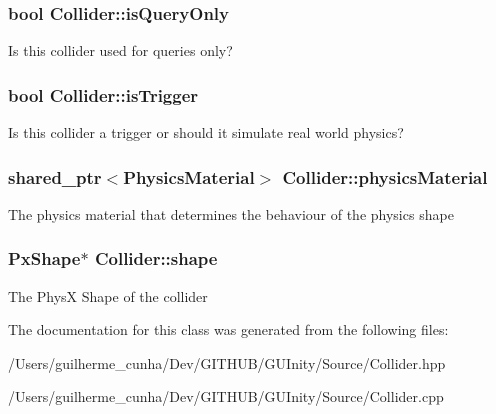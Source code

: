 \subsubsection[{is\+Query\+Only}]{\setlength{\rightskip}{0pt plus 5cm}bool Collider\+::is\+Query\+Only\hspace{0.3cm}{\ttfamily [protected]}}\label{class_collider_a7a04883dc178bfc1b0bbf7750eb9f4d1}
Is this collider used for queries only? \hypertarget{class_collider_a3068bd0bbdb66fc93a3ef3063ac556fa}{}
\subsubsection[{is\+Trigger}]{\setlength{\rightskip}{0pt plus 5cm}bool Collider\+::is\+Trigger\hspace{0.3cm}{\ttfamily [protected]}}\label{class_collider_a3068bd0bbdb66fc93a3ef3063ac556fa}
Is this collider a trigger or should it simulate real world physics? \hypertarget{class_collider_a7cf889cd7bc213bcac3e0c6f5f42f150}{}
\subsubsection[{physics\+Material}]{\setlength{\rightskip}{0pt plus 5cm}shared\+\_\+ptr$<${\bf Physics\+Material}$>$ Collider\+::physics\+Material\hspace{0.3cm}{\ttfamily [protected]}}\label{class_collider_a7cf889cd7bc213bcac3e0c6f5f42f150}
The physics material that determines the behaviour of the physics shape \hypertarget{class_collider_a0eabd23889c23a5cb622547b1fc484d8}{}
\subsubsection[{shape}]{\setlength{\rightskip}{0pt plus 5cm}Px\+Shape$\ast$ Collider\+::shape\hspace{0.3cm}{\ttfamily [protected]}}\label{class_collider_a0eabd23889c23a5cb622547b1fc484d8}
The Phys\+X Shape of the collider 

The documentation for this class was generated from the following files\+:\begin{DoxyCompactItemize}
\item 
/\+Users/guilherme\+\_\+cunha/\+Dev/\+G\+I\+T\+H\+U\+B/\+G\+U\+Inity/\+Source/Collider.\+hpp\item 
/\+Users/guilherme\+\_\+cunha/\+Dev/\+G\+I\+T\+H\+U\+B/\+G\+U\+Inity/\+Source/Collider.\+cpp\end{DoxyCompactItemize}
